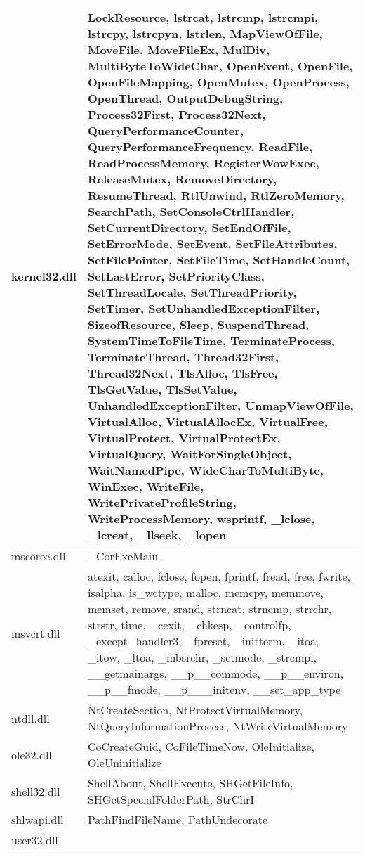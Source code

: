 \begin{longtable}[H]{ | m{3.5cm} | m{10cm} | }
\hline
kernel32.dll & LockResource, lstrcat, lstrcmp, lstrcmpi, lstrcpy, lstrcpyn, lstrlen, MapViewOfFile, MoveFile, MoveFileEx, MulDiv, MultiByteToWideChar, OpenEvent, OpenFile, OpenFileMapping, OpenMutex, OpenProcess, OpenThread, OutputDebugString, Process32First, Process32Next, QueryPerformanceCounter, QueryPerformanceFrequency, ReadFile, ReadProcessMemory, RegisterWowExec, ReleaseMutex, RemoveDirectory, ResumeThread, RtlUnwind, RtlZeroMemory, SearchPath, SetConsoleCtrlHandler, SetCurrentDirectory, SetEndOfFile, SetErrorMode, SetEvent, SetFileAttributes, SetFilePointer, SetFileTime, SetHandleCount, SetLastError, SetPriorityClass, SetThreadLocale, SetThreadPriority, SetTimer, SetUnhandledExceptionFilter, SizeofResource, Sleep, SuspendThread, SystemTimeToFileTime, TerminateProcess, TerminateThread, Thread32First, Thread32Next, TlsAlloc, TlsFree, TlsGetValue, TlsSetValue, UnhandledExceptionFilter, UnmapViewOfFile, VirtualAlloc, VirtualAllocEx, VirtualFree, VirtualProtect, VirtualProtectEx, VirtualQuery, WaitForSingleObject, WaitNamedPipe, WideCharToMultiByte, WinExec, WriteFile, WritePrivateProfileString, WriteProcessMemory, wsprintf, \_lclose, \_lcreat, \_llseek, \_lopen \\
\hline
mscoree.dll &
\_CorExeMain \\
\hline
msvcrt.dll &
atexit, calloc, fclose, fopen, fprintf, fread, free, fwrite, isalpha, is\_wctype, malloc, memcpy, memmove, memset, remove, srand, strncat, strncmp, strrchr, strstr, time, \_cexit, \_chkesp, \_controlfp, \_except\_handler3, \_fpreset, \_initterm, \_itoa, \_itow, \_ltoa, \_mbsrchr, \_setmode, \_strcmpi, \_\_getmainargs, \_\_p\_\_commode, \_\_p\_\_environ, \_\_p\_\_fmode, \_\_p\_\_\_initenv, \_\_set\_app\_type \\
\hline
ntdll.dll &
NtCreateSection, NtProtectVirtualMemory, NtQueryInformationProcess, NtWriteVirtualMemory \\
\hline
ole32.dll &
CoCreateGuid, CoFileTimeNow, OleInitialize, OleUninitialize \\
\hline
shell32.dll &
ShellAbout, ShellExecute, SHGetFileInfo, SHGetSpecialFolderPath, StrChrI \\
\hline
shlwapi.dll &
PathFindFileName, PathUndecorate \\
\hline
user32.dll &

\end{longtable}
